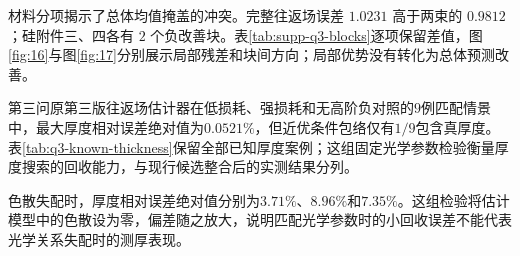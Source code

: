 材料分项揭示了总体均值掩盖的冲突。完整往返场误差 $1.0231$ 高于两束的 $0.9812$；硅附件三、四各有 $2$ 个负改善块。表\ref{tab:supp-q3-blocks}逐项保留差值，图\ref{fig:16}与图\ref{fig:17}分别展示局部残差和块间方向；局部优势没有转化为总体预测改善。

第三问原第三版往返场估计器在低损耗、强损耗和无高阶负对照的$9$例匹配情景中，最大厚度相对误差绝对值为$0.0521\%$，但近优条件包络仅有$1/9$包含真厚度。表\ref{tab:q3-known-thickness}保留全部已知厚度案例；这组固定光学参数检验衡量厚度搜索的回收能力，与现行候选整合后的实测结果分列。

色散失配时，厚度相对误差绝对值分别为$3.71\%$、$8.96\%$和$7.35\%$。这组检验将估计模型中的色散设为零，偏差随之放大，说明匹配光学参数时的小回收误差不能代表光学关系失配时的测厚表现。

